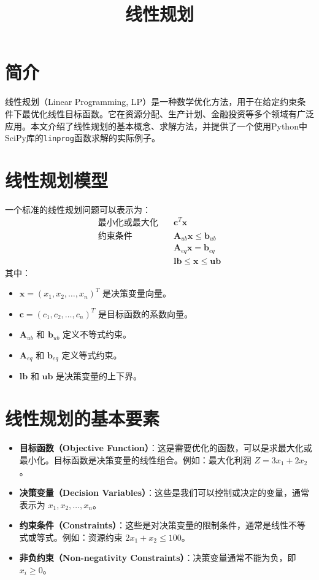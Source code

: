 \documentclass{article}
\title{线性规划}
\author{}
\date{}
\begin{document}
\maketitle

\section{简介}
线性规划（Linear Programming, LP）是一种数学优化方法，用于在给定约束条件下最优化线性目标函数。它在资源分配、生产计划、金融投资等多个领域有广泛应用。本文介绍了线性规划的基本概念、求解方法，并提供了一个使用Python中SciPy库的\texttt{linprog}函数求解的实际例子。

\section{线性规划模型}
一个标准的线性规划问题可以表示为：
\begin{align*}
\text{最小化或最大化} \quad & \mathbf{c}^T \mathbf{x} \\
\text{约束条件} \quad & \mathbf{A}_{ub} \mathbf{x} \leq \mathbf{b}_{ub} \\
& \mathbf{A}_{eq} \mathbf{x} = \mathbf{b}_{eq} \\
& \mathbf{lb} \leq \mathbf{x} \leq \mathbf{ub}
\end{align*}
其中：
\begin{itemize}
    \item \(\mathbf{x} = (x_1, x_2, \ldots, x_n)^T\) 是决策变量向量。
    \item \(\mathbf{c} = (c_1, c_2, \ldots, c_n)^T\) 是目标函数的系数向量。
    \item \(\mathbf{A}_{ub}\) 和 \(\mathbf{b}_{ub}\) 定义不等式约束。
    \item \(\mathbf{A}_{eq}\) 和 \(\mathbf{b}_{eq}\) 定义等式约束。
    \item \(\mathbf{lb}\) 和 \(\mathbf{ub}\) 是决策变量的上下界。
\end{itemize}

\section{线性规划的基本要素}
\begin{itemize}
    \item \textbf{目标函数（Objective Function）}：这是需要优化的函数，可以是求最大化或最小化。目标函数是决策变量的线性组合。例如：最大化利润 \( Z = 3x_1 + 2x_2 \)。
    \item \textbf{决策变量（Decision Variables）}：这些是我们可以控制或决定的变量，通常表示为 \( x_1, x_2, \ldots, x_n \)。
    \item \textbf{约束条件（Constraints）}：这些是对决策变量的限制条件，通常是线性不等式或等式。例如：资源约束 \( 2x_1 + x_2 \leq 100 \)。
    \item \textbf{非负约束（Non-negativity Constraints）}：决策变量通常不能为负，即 \( x_i \geq 0 \)。
\end{itemize}
\end{document}
